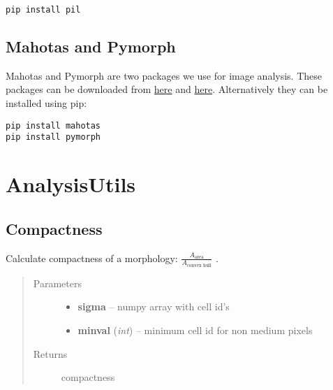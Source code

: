 \documentclass[letterpaper,10pt,english]{sphinxmanual}
\begin{document}
\begin{Verbatim}[commandchars=\\\{\}]
pip install pil
\end{Verbatim}


\section{Mahotas and Pymorph}
\label{Preq:mahotas-and-pymorph}
Mahotas and Pymorph are two packages we use for image analysis. These packages can be downloaded from \href{https://pypi.python.org/pypi/mahotas}{here} and \href{https://pypi.python.org/pypi/pymorph}{here}. Alternatively they can be installed using pip:

\begin{Verbatim}[commandchars=\\\{\}]
pip install mahotas
pip install pymorph
\end{Verbatim}


\chapter{AnalysisUtils}
\label{AnalysisUtils:analysisutils}\label{AnalysisUtils::doc}

\section{Compactness}
\label{AnalysisUtils:compactness}

\begin{fulllineitems}
\label{AnalysisUtils:AnalysisUtils.getCompactness}
Calculate compactness of a morphology: $\frac{A_{\text{area}}}{A_{\text{convex hull}}}$ .
\begin{quote}\begin{description}
\item[{Parameters}] \leavevmode\begin{itemize}
\item {} 
\textbf{sigma} -- numpy array with cell id's

\item {} 
\textbf{minval} (\emph{int}) -- minimum cell id for non medium pixels

\end{itemize}

\item[{Returns}] \leavevmode
compactness

\end{description}\end{quote}

\end{fulllineitems}
\end{document}
